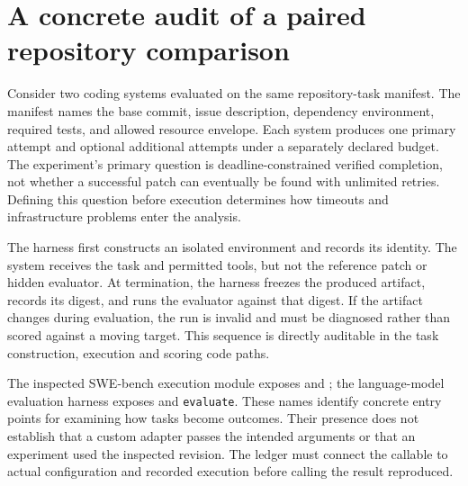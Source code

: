 \section{A concrete audit of a paired repository comparison}\label{sec:C26:pairedcase}
Consider two coding systems evaluated on the same repository-task manifest. The manifest names the base commit, issue description, dependency environment, required tests, and allowed resource envelope. Each system produces one primary attempt and optional additional attempts under a separately declared budget. The experiment's primary question is deadline-constrained verified completion, not whether a successful patch can eventually be found with unlimited retries. Defining this question before execution determines how timeouts and infrastructure problems enter the analysis.

The harness first constructs an isolated environment and records its identity. The system receives the task and permitted tools, but not the reference patch or hidden evaluator. At termination, the harness freezes the produced artifact, records its digest, and runs the evaluator against that digest. If the artifact changes during evaluation, the run is invalid and must be diagnosed rather than scored against a moving target. This sequence is directly auditable in the task construction, execution and scoring code paths.

The inspected SWE-bench execution module exposes  and ; the language-model evaluation harness exposes  and \texttt{evaluate}. These names identify concrete entry points for examining how tasks become outcomes\cite{jimenez2023swebench,repo_lm_eval}. Their presence does not establish that a custom adapter passes the intended arguments or that an experiment used the inspected revision. The ledger must connect the callable to actual configuration and recorded execution before calling the result reproduced.

